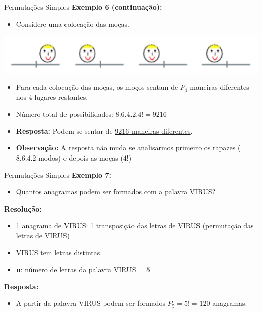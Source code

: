 \documentclass[aspectratio=169]{beamer}
\begin{document}
\begin{frame}{Permutações Simples}
    \textbf{Exemplo 6 (continuação):}

    \vspace{2mm}

    \begin{itemize}
        \item[] Considere uma colocação das moças.
    \end{itemize}

    \begin{center}
        \includegraphics[width=0.65\linewidth]{figs/Exemplo6_6.png}
    \end{center}

    \pause
    \begin{itemize}
        \item Para cada colocação das moças, os moços sentam de $P_4$ maneiras diferentes nos 4 lugares restantes. \pause
        \item Número total de possibilidades: $8 . 6 . 4 . 2 . 4! = 9216$ \pause
        \item \textbf{Resposta:} Podem se sentar de \underline{9216 maneiras diferentes}. \pause
        \item \textbf{Observação:} A resposta não muda se analisarmos primeiro os rapazes ($8 . 6 . 4 . 2$ modos) e depois as moças ($4!$)
    \end{itemize}
\end{frame}

\begin{frame}{Permutações Simples}
    \textbf{Exemplo 7:}

    \vspace{2mm}

    \begin{itemize}
        \item[] Quantos anagramas podem ser formados com a palavra VIRUS?
    \end{itemize}

    \pause
    \vspace{3mm}
    \textbf{Resolução:}
    
    \begin{itemize}
        \item 1 anagrama de VIRUS: 1 transposição das letras de VIRUS (permutação das letras de VIRUS) \pause
        \item VIRUS tem letras distintas \pause
        \item \textbf{n}: número de letras da palavra VIRUS = \textbf{5}
    \end{itemize}

    \pause
    \vspace{3mm}
    \textbf{Resposta:}
    \begin{itemize}
        \item[] A partir da palavra VIRUS podem ser formados $P_5 = 5! = 120$ anagramas.
    \end{itemize}
\end{frame}
\end{document}
